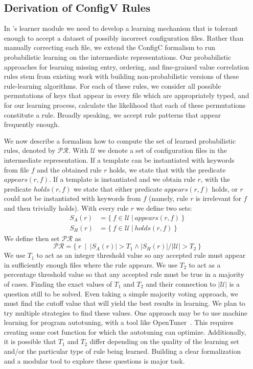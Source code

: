 \subsection{Derivation of ConfigV Rules}
\label{subsec-rules}

In \app's learner module we need to develop a learning mechanism
that is tolerant 
enough to accept a dataset of possibly incorrect configuration files.
Rather than manually correcting each file, 
we extend the ConfigC formalism to run probabilistic learning
on the intermediate representations.
Our probabilistic approaches for learning missing entry, 
ordering, and fine-grained value correlation rules stem 
from existing work with building 
non-probabilistic versions of these rule-learning algorithms. 
For each of these rules, 
we consider all possible permutations of keys that appear in every 
file which are appropriately typed, and for our learning process, calculate the likelihood that each of 
these permutations constitute a rule. 
Broadly speaking, we accept rule patterns that appear frequently enough.

We now describe a formalism how to compute the set of learned
probabilistic rules, denoted by $\mathcal{PR}$.
With $\mathcal{U}$ we denote a set of configuration files in the 
intermediate representation. If a template can be instantiated with
keywords from file $f$ and the obtained rule $r$ holds, we state that with the predicate 
$\mathit{appears}(r,f)$.
If a template is instantiated and we obtain rule $r$, with  the predicate 
$\mathit{holds}(r,f)$ we state that either predicate $\mathit{appears}(r,f)$ holds, or 
$r$ could not be instantiated with keywords from $f$ (namely, rule $r$ is irrelevant 
for $f$ and then trivially holds). With every 
rule $r$ we define two sets:
\begin{align*}
S_A(r)& =\{ \ f \in \mathcal{U}\ | \ \mathit{appears}(r,f)\  \} \\
S_H(r)& =\{ \ f \in \mathcal{U}\  | \ \mathit{holds}(r,f) \ \}
\end{align*}
We define then set $\mathcal{PR}$ as
$$\mathcal{PR} = \{\ r \ \mid \ |S_A(r)| > T_1 \land |S_H(r)|/|\mathcal{U}| > T_2 \ \} $$
We use $T_1$ to act as an integer threshold value so any accepted rule must appear in sufficiently enough files where the rule appears. 
We use $T_2$ to act as a percentage threshold value so that any accepted rule must be true in a majority of cases. 
Finding the exact values of $T_1$ and $T_2$
and their connection to $|\mathcal{U}|$
is a question still to be solved.
Even taking a simple majority voting approach, we must find the cutoff value that will yield the best results in learning.
We plan to try multiple strategies to find these values.
One approach may be to use machine learning for program autotuning, with a tool like OpenTuner~\cite{ansel:pact:2014}.
This requires creating some cost function for which the autotuning can optimize.
Additionally, it is possible that $T_1$ and $T_2$ differ depending on the quality of the learning set and/or the particular type of rule being learned.
Building a clear formalization and a modular tool to explore these questions is major task.

